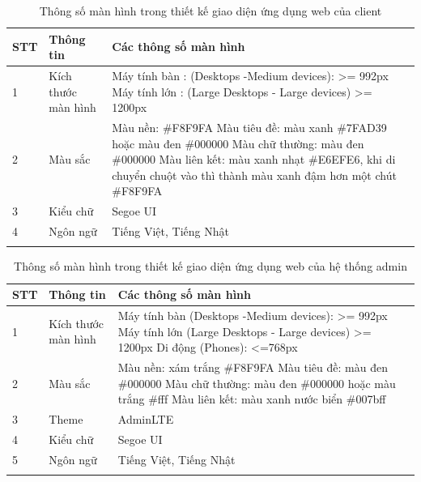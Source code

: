 \documentclass{article}
\begin{document}
    \begin{longtable}{| p{} | p{} | p{} |} 
    \hline
        \bfseries STT & \bfseries Thông tin & \bfseries Các thông số màn hình  \\\hline
        1 & Kích thước màn hình &
        Máy tính bàn : (Desktops -Medium devices): >= 992px
        Máy tính lớn : (Large Desktops - Large devices) >= 1200px\\\hline
        2 & Màu sắc &
        Màu nền: \#F8F9FA
        Màu tiêu đề: màu xanh \#7FAD39 hoặc màu đen \#000000
        Màu chữ thường: màu đen \#000000
        Màu liên kết: màu xanh nhạt \#E6EFE6, khi di chuyển chuột vào thì thành màu xanh đậm hơn một chút \#F8F9FA
        \\\hline
        3 & Kiểu chữ &
        Segoe UI
        \\\hline
        4 & Ngôn ngữ &
        Tiếng Việt, Tiếng Nhật
        \\\hline
    \caption{Thông số màn hình trong thiết kế giao diện ứng dụng web của client}
    \label{bang41}
    \end{longtable}

    \begin{longtable}{| p{} | p{} | p{} |} 
    \hline
        \bfseries STT & \bfseries Thông tin & \bfseries Các thông số màn hình  \\\hline
        1 & Kích thước màn hình &
        Máy tính bàn
        (Desktops -Medium devices): >= 992px
        Máy tính lớn
        (Large Desktops - Large devices) >= 1200px
        Di động
        (Phones): <=768px
        \\\hline
        2 & Màu sắc &
        Màu nền: xám trắng \#F8F9FA
        Màu tiêu đề: màu đen \#000000
        Màu chữ thường: màu đen \#000000 hoặc màu trắng \#fff
        Màu liên kết:  màu xanh nước biển \#007bff
        \\\hline
        3 & Theme &
        AdminLTE
        \\\hline
        4 & Kiểu chữ &
        Segoe UI
        \\\hline
        5 & Ngôn ngữ &
        Tiếng Việt, Tiếng Nhật
        \\\hline
    \caption{Thông số màn hình trong thiết kế giao diện ứng dụng web của hệ thống admin}
    \label{bang42}
    \end{longtable}
\end{document}
